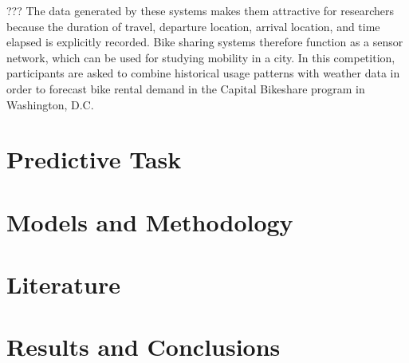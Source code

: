   ??? The data generated by these systems makes them attractive for researchers because the duration of travel, departure location, arrival location, and time elapsed is explicitly recorded. Bike sharing systems therefore function as a sensor network, which can be used for studying mobility in a city. In this competition, participants are asked to combine historical usage patterns with weather data in order to forecast bike rental demand in the Capital Bikeshare program in Washington, D.C.

\section{Predictive Task}

\section{Models and Methodology}

\section{Literature}

\section{Results and Conclusions}







